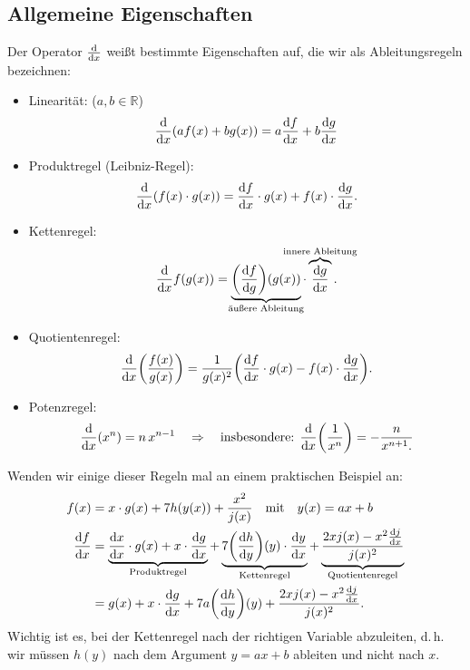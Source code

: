 \subsection{Allgemeine Eigenschaften}

Der Operator $\dv{x}$ weißt bestimmte Eigenschaften auf, die wir als Ableitungsregeln bezeichnen: 
\begin{itemize}
    \item Linearität: ($a,b \in \mathbb{R}$)
    \begin{align}
        \dv{x}(a f(x) + b g(x)) = a \dv{f}{x} + b \dv{g}{x}
    \end{align}
    \item Produktregel (Leibniz-Regel):
    \begin{align}
        \dv{x}(f(x)\cdot g(x)) = \dv{f}{x} \cdot g(x) + f(x) \cdot \dv{g}{x}.
    \end{align}
    \item Kettenregel: \vspace{-0.5cm}
    \begin{align}
        \dv{x} f(g(x)) = \underbrace{\qty(\dv{f}{g})(g(x))}_{\mathclap{\text{äußere Ableitung}}}\cdot \overbrace{\dv{g}{x}}^{\mathclap{\text{innere Ableitung}}}.
    \end{align}
    \item Quotientenregel: 
    \begin{align}
        \dv{x}\qty(\frac{f(x)}{g(x)}) = \frac{1}{g(x)^2} \qty(\dv{f}{x}\cdot g(x) - f(x) \cdot \dv{g}{x}).
    \end{align}
    \item Potenzregel: 
    \begin{align}
        \dv{x}\qty(x^n) = n \, x^{n-1} \quad \Rightarrow \quad \text{insbesondere: } \dv{x}\qty(\frac{1}{x^n}) = - \frac{n}{x^{n+1}.}
    \end{align}
\end{itemize}
Wenden wir einige dieser Regeln mal an einem praktischen Beispiel an: 
\begin{align}
    f(x) &=x \cdot g(x) + 7 h(y(x)) + \frac{x^2}{j(x)} \qq{mit} y(x) = ax + b \notag \\
    \dv{f}{x} &= \underbrace{\dv{x}{x} \cdot g(x) + x \cdot \dv{g}{x}}_{\text{Produktregel}} + \underbrace{7 \qty(\dv{h}{y})(y) \cdot \dv{y}{x}}_{\text{Kettenregel}} + \underbrace{\frac{2 x j(x) - x^2 \dv{j}{x}}{j(x)^2}}_{\text{Quotientenregel}}\notag \\
    &= g(x) +  x \cdot \dv{g}{x} + 7a \qty(\dv{h}{y})(y)  + \frac{2x j(x) - x^2 \dv{j}{x}}{j(x)^2}.
\end{align}
Wichtig ist es, bei der Kettenregel nach der richtigen Variable abzuleiten, d.\,h. wir müssen $h(y)$ nach dem Argument $y = ax+ b$ ableiten und nicht nach $x$. 


